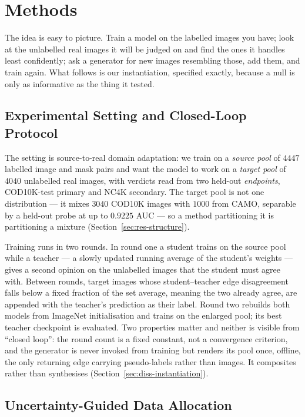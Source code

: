 \documentclass{article} %
\begin{document}
\section{Methods}
\label{sec:method}

The idea is easy to picture. Train a model on the labelled images you have; look at the unlabelled
real images it will be judged on and find the ones it handles least confidently; ask a generator for
new images resembling those, add them, and train again. What follows is our instantiation, specified
exactly, because a null is only as informative as the thing it tested.

\subsection{Experimental Setting and Closed-Loop Protocol}
\label{sec:method-setting}

The setting is source-to-real domain adaptation: we train on a \emph{source pool} of $4447$ labelled
image and mask pairs and want the model to work on a \emph{target pool} of $4040$ unlabelled real
images, with verdicts read from two held-out \emph{endpoints}, COD10K-test primary and NC4K
secondary. The target pool is not one distribution --- it mixes $3040$ COD10K images with $1000$ from
CAMO, separable by a held-out probe at up to $0.9225$ AUC --- so a method partitioning it is
partitioning a mixture (Section~\ref{sec:res-structure}).

Training runs in two rounds. In round one a student trains on the source pool while a teacher --- a
slowly updated running average of the student's weights --- gives a second opinion on the unlabelled
images that the student must agree with. Between rounds, target images whose student--teacher edge
disagreement falls below a fixed fraction of the set average, meaning the two already agree, are
appended with the teacher's prediction as their label. Round two rebuilds both models from ImageNet
initialisation and trains on the enlarged pool; its best teacher checkpoint is evaluated. Two properties matter and neither is visible from ``closed loop'': the round count is a
fixed constant, not a convergence criterion, and the generator is never invoked from training but
renders its pool once, offline, the only returning edge carrying pseudo-labels rather than images.
It composites rather than synthesises
(Section~\ref{sec:diss-instantiation}).

\subsection{Uncertainty-Guided Data Allocation}
\label{sec:method-allocation}
\end{document}
